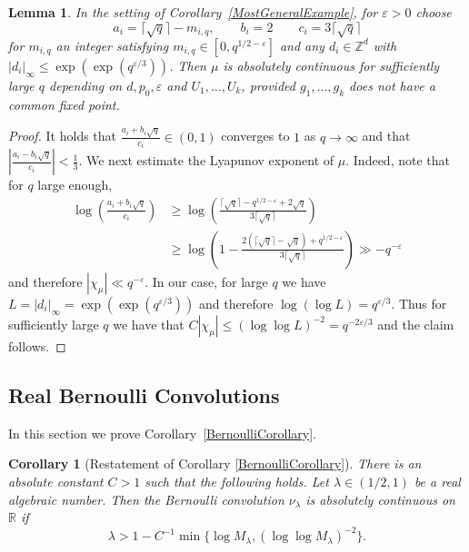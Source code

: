 \documentclass[10pt, english,oneside,reqno]{amsart}
\newtheorem*{corollary*}{Corollary}
\theoremstyle{plain}
\newtheorem{lemma}[theorem]{Lemma}
\theoremstyle{remark}
\numberwithin{equation}{section}
\numberwithin{figure}{section}
\newcommand{\eps}{\varepsilon}
\newcommand{\Z}{\mathbb{Z}}
\newcommand{\R}{\mathbb{R}}
\begin{document}
\begin{lemma}\label{MostGeneralParticualr}
    In the setting of Corollary~\ref{MostGeneralExample}, for $\eps > 0$ choose $$a_i = \lceil \sqrt{q} \rceil - m_{i,q}, \quad \quad b_i = 2 \quad\quad c_i = 3\lceil \sqrt{q} \rceil$$ for  $m_{i,q}$ an integer satisfying $m_{i,q} \in [0,q^{1/2 - \eps}]$ and any $d_i \in \Z^d$ with $|d_i|_{\infty} \leq \exp(\exp(q^{\eps/3}))$. Then $\mu$ is absolutely continuous for sufficiently large $q$ depending on $d,p_0, \eps$ and $U_1, \ldots , U_k$, provided $g_1, \ldots , g_k$ does not have a common fixed point.
\end{lemma}

\begin{proof}
    It holds that $\frac{a_i + b_i\sqrt{q}}{c_i} \in (0,1)$ converges to $1$ as $q \to \infty$ and that $|\frac{a_i - b_i\sqrt{q}}{c_i}| < \frac{1}{3}$. We next estimate the Lyapunov exponent of $\mu$. Indeed, note that for $q$ large enough,
    \begin{align*}
        \log\left( \frac{a_i + b_i\sqrt{q}}{c_i} \right) &\geq \log\left( \frac{\lceil \sqrt{q} \rceil - q^{1/2-\eps} + 2\sqrt{q}}{3\lceil \sqrt{q} \rceil }\right) \\
        &\geq \log\left( 1 - \frac{2(\lceil \sqrt{q}\rceil - \sqrt{q}) + q^{1/2-\eps}}{3\lceil \sqrt{q} \rceil }\right) \gg -q^{-\eps}
    \end{align*} and therefore $|\chi_{\mu}| \ll q^{-\eps}$. In our case, for large $q$ we have  $L = |d_i|_{\infty} = \exp(\exp(q^{\eps/3}))$ and therefore $\log(\log L) = q^{\eps/3}$. Thus for sufficiently large $q$ we have that $C|\chi_{\mu}| \leq  (\log\log L)^{-2} = q^{-2\eps/3}$ and the claim follows. 
\end{proof}



\subsection{Real Bernoulli Convolutions}
\label{section:RealBern}

In this section we prove Corollary~\ref{BernoulliCorollary}.

\begin{corollary*}[Restatement of Corollary \ref{BernoulliCorollary}]
		There is an absolute constant $C > 1$ such that the following holds. Let $\lambda \in (1/2,1)$ be a real algebraic number. Then the Bernoulli convolution $\nu_{\lambda}$ is absolutely continuous on $\R$ if 
		\begin{equation}\label{BernoulliCond}
		\lambda > 1 - C^{-1}\min\{\log M_{\lambda},(\log \log M_{\lambda})^{-2} \} .
		\end{equation}
\end{corollary*}
\end{document}
